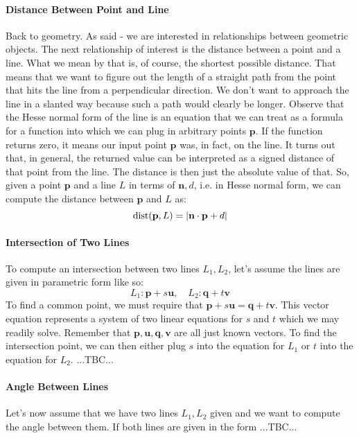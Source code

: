 \paragraph{Distance Between Point and Line}
Back to geometry. As said - we are interested in relationships between geometric objects. The next relationship of interest is the distance between a point and a line. What we mean by that is, of course, the shortest possible distance. That means that we want to figure out the length of a straight path from the point that hits the line from a perpendicular direction. We don't want to approach the line in a slanted way because such a path would clearly be longer. Observe that the Hesse normal form of the line is an equation that we can treat as a formula for a function into which we can plug in arbitrary points $\mathbf{p}$. If the function returns zero, it means our input point $\mathbf{p}$ was, in fact, on the line. It turns out that, in general, the returned value can be interpreted as a signed distance of that point from the line. The distance is then just the absolute value of that. So, given a point $\mathbf{p}$ and a line $L$ in terms of $\mathbf{n}, d$, i.e. in Hesse normal form, we can compute the distance between $\mathbf{p}$ and $L$ as:
\begin{equation}
\operatorname{dist}(\mathbf{p}, L) = | \mathbf{n} \cdot \mathbf{p} + d |
\end{equation}

\paragraph{Intersection of Two Lines}
To compute an intersection between two lines $L_1, L_2$, let's assume the lines are given in parametric form like so:
\begin{equation}
L_1: \mathbf{p} + s \mathbf{u}, \quad
L_2: \mathbf{q} + t \mathbf{v}
\end{equation}
To find a common point, we must require that $\mathbf{p} + s \mathbf{u} = \mathbf{q} + t \mathbf{v}$. This vector equation represents a system of two linear equations for $s$ and $t$ which we may readily solve. Remember that $\mathbf{p,u,q,v}$ are all just known vectors. To find the intersection point, we can then either plug $s$ into the equation for $L_1$ or $t$ into the equation for $L_2$. ...TBC...


\paragraph{Angle Between Lines}
Let's now assume that we have two lines $L_1, L_2$ given and we want to compute the angle between them. If both lines are given in the form ...TBC...





